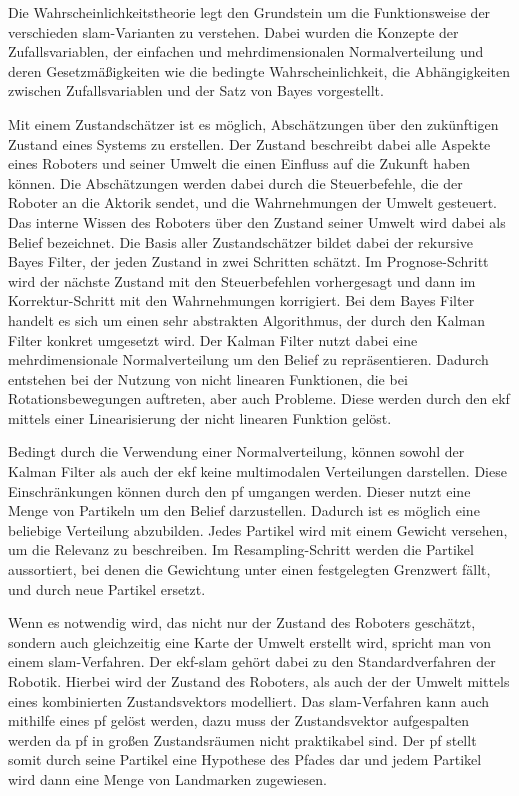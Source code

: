 Die Wahrscheinlichkeitstheorie legt den Grundstein um die Funktionsweise der verschieden \gls{slam}-Varianten zu verstehen. Dabei wurden die Konzepte der Zufallsvariablen, der einfachen und mehrdimensionalen Normalverteilung und deren Gesetzmäßigkeiten wie die bedingte Wahrscheinlichkeit, die Abhängigkeiten zwischen Zufallsvariablen und der Satz von Bayes vorgestellt.

Mit einem Zustandschätzer ist es möglich, Abschätzungen über den zukünftigen Zustand eines Systems zu erstellen. Der Zustand beschreibt dabei alle Aspekte eines Roboters und seiner Umwelt die einen Einfluss auf die Zukunft haben können. Die Abschätzungen werden dabei durch die Steuerbefehle, die der Roboter an die Aktorik sendet, und die Wahrnehmungen der Umwelt gesteuert. Das interne Wissen des Roboters über den Zustand seiner Umwelt wird dabei als Belief bezeichnet. Die Basis aller Zustandschätzer bildet dabei der rekursive Bayes Filter, der jeden Zustand in zwei Schritten schätzt. Im Prognose-Schritt wird der nächste Zustand mit den Steuerbefehlen vorhergesagt und dann im Korrektur-Schritt mit den Wahrnehmungen korrigiert. Bei dem Bayes Filter handelt es sich um einen sehr abstrakten Algorithmus, der durch den Kalman Filter konkret umgesetzt wird. Der Kalman Filter nutzt dabei eine mehrdimensionale Normalverteilung um den Belief zu repräsentieren. Dadurch entstehen bei der Nutzung von nicht linearen Funktionen, die bei Rotationsbewegungen auftreten, aber auch Probleme. Diese werden durch den \gls{ekf} mittels einer Linearisierung der nicht linearen Funktion gelöst.

Bedingt durch die Verwendung einer Normalverteilung, können sowohl der Kalman Filter als auch der \gls{ekf} keine multimodalen Verteilungen darstellen. Diese Einschränkungen können durch den \gls{pf} umgangen werden. Dieser nutzt eine Menge von Partikeln um den Belief darzustellen. Dadurch ist es möglich eine beliebige Verteilung abzubilden. Jedes Partikel wird mit einem Gewicht versehen, um die Relevanz zu beschreiben. Im Resampling-Schritt werden die Partikel aussortiert, bei denen die Gewichtung unter einen festgelegten Grenzwert fällt, und durch neue Partikel ersetzt.

Wenn es notwendig wird, das nicht nur der Zustand des Roboters geschätzt, sondern auch gleichzeitig eine Karte der Umwelt erstellt wird, spricht man von einem \gls{slam}-Verfahren. Der \gls{ekf}-\gls{slam} gehört dabei zu den Standardverfahren der Robotik. Hierbei wird der Zustand des Roboters, als auch der der Umwelt mittels eines kombinierten Zustandsvektors modelliert. Das \gls{slam}-Verfahren kann auch mithilfe eines \gls{pf} gelöst werden, dazu muss der Zustandsvektor aufgespalten werden da \gls{pf} in großen Zustandsräumen nicht praktikabel sind. Der \gls{pf} stellt somit durch seine Partikel eine Hypothese des Pfades dar und jedem Partikel wird dann eine Menge von Landmarken zugewiesen.

